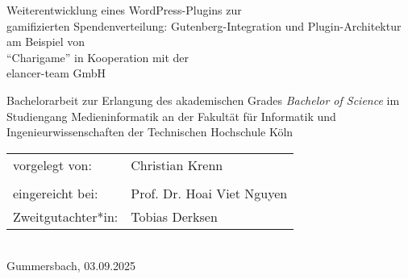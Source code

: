 \begin{titlepage}
%
\sffamily%
%
\begin{center}
\end{center}
%
\vfill
%
\begin{huge}
    Weiterentwicklung eines WordPress-Plugins zur \\gamifizierten Spendenverteilung:
    Gutenberg-Integration und Plugin-Architektur am Beispiel von \\``Charigame'' in Kooperation mit der \\elancer-team GmbH\\[10mm]
\end{huge}
%
Bachelorarbeit zur Erlangung des akademischen Grades\newline
\emph{Bachelor of Science}\newline
im Studiengang Medieninformatik\newline
an der Fakultät für Informatik und Ingenieurwissenschaften\newline
der Technischen Hochschule Köln
%
\vfill
%
\begin{tabular}{@{}ll}
vorgelegt von: & Christian Krenn\\
               \\[5mm]
eingereicht bei:   & Prof. Dr. Hoai Viet Nguyen\\
Zweitgutachter*in: & Tobias Derksen
\end{tabular}	
%
\\[10mm]
%
Gummersbach, 03.09.2025%
%
\rmfamily%
%
\end{titlepage}